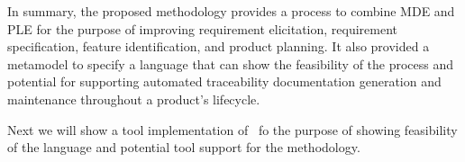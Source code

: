 In summary, the proposed methodology provides a process to combine \ac{MDE} and \ac{PLE} for the purpose of improving requirement elicitation, requirement specification, feature identification, and product planning. It also provided a metamodel to specify a language that can show the feasibility of the process and potential for supporting automated traceability documentation generation and maintenance throughout a product's lifecycle. 

Next we will show a tool implementation of \tool\ fo the purpose of showing feasibility of the language and potential tool support for the methodology.




